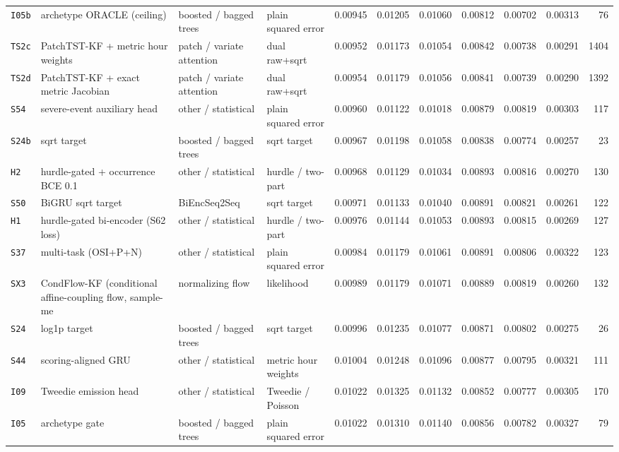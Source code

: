 \documentclass[9pt,landscape]{article}
\begin{document}
\begin{longtable}{@{}p{1.1cm}p{5.4cm}p{3.1cm}p{2.7cm}rrrrrrr@{}}
\texttt{I05b} & archetype ORACLE (ceiling) & boosted / bagged trees & plain squared error & 0.00945 & 0.01205 & 0.01060 & 0.00812 & 0.00702 & 0.00313 & 76 \\
\rowcolor{gray!15}\texttt{TS2c} & PatchTST-KF + metric hour weights & patch / variate attention & dual raw+sqrt & 0.00952 & 0.01173 & 0.01054 & 0.00842 & 0.00738 & 0.00291 & 1404 \\
\texttt{TS2d} & PatchTST-KF + exact metric Jacobian & patch / variate attention & dual raw+sqrt & 0.00954 & 0.01179 & 0.01056 & 0.00841 & 0.00739 & 0.00290 & 1392 \\
\texttt{S54} & severe-event auxiliary head & other / statistical & plain squared error & 0.00960 & 0.01122 & 0.01018 & 0.00879 & 0.00819 & 0.00303 & 117 \\
\texttt{S24b} & sqrt target & boosted / bagged trees & sqrt target & 0.00967 & 0.01198 & 0.01058 & 0.00838 & 0.00774 & 0.00257 & 23 \\
\texttt{H2} & hurdle-gated + occurrence BCE 0.1 & other / statistical & hurdle / two-part & 0.00968 & 0.01129 & 0.01034 & 0.00893 & 0.00816 & 0.00270 & 130 \\
\texttt{S50} & BiGRU sqrt target & BiEncSeq2Seq & sqrt target & 0.00971 & 0.01133 & 0.01040 & 0.00891 & 0.00821 & 0.00261 & 122 \\
\texttt{H1} & hurdle-gated bi-encoder (S62 loss) & other / statistical & hurdle / two-part & 0.00976 & 0.01144 & 0.01053 & 0.00893 & 0.00815 & 0.00269 & 127 \\
\texttt{S37} & multi-task (OSI+P+N) & other / statistical & plain squared error & 0.00984 & 0.01179 & 0.01061 & 0.00891 & 0.00806 & 0.00322 & 123 \\
\texttt{SX3} & CondFlow-KF (conditional affine-coupling flow, sample-me & normalizing flow & likelihood & 0.00989 & 0.01179 & 0.01071 & 0.00889 & 0.00819 & 0.00260 & 132 \\
\texttt{S24} & log1p target & boosted / bagged trees & sqrt target & 0.00996 & 0.01235 & 0.01077 & 0.00871 & 0.00802 & 0.00275 & 26 \\
\texttt{S44} & scoring-aligned GRU & other / statistical & metric hour weights & 0.01004 & 0.01248 & 0.01096 & 0.00877 & 0.00795 & 0.00321 & 111 \\
\texttt{I09} & Tweedie emission head & other / statistical & Tweedie / Poisson & 0.01022 & 0.01325 & 0.01132 & 0.00852 & 0.00777 & 0.00305 & 170 \\
\texttt{I05} & archetype gate & boosted / bagged trees & plain squared error & 0.01022 & 0.01310 & 0.01140 & 0.00856 & 0.00782 & 0.00327 & 79 \\

\end{longtable}
\end{document}
